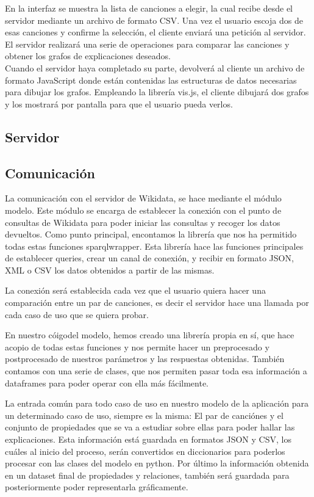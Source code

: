 En la interfaz se muestra la lista de canciones a elegir, la cual recibe desde el servidor mediante un archivo de formato CSV. Una vez el usuario escoja dos de esas canciones y confirme la selección, el cliente enviará una petición al servidor. El servidor realizará una serie de operaciones para comparar las canciones y obtener los grafos de explicaciones deseados.\\

Cuando el servidor haya completado su parte, devolverá al cliente un archivo de formato JavaScript donde están contenidas las estructuras de datos necesarias para dibujar los grafos. Empleando la librería vis.js, el cliente dibujará dos grafos y los mostrará por pantalla para que el usuario pueda verlos.\\

\subsection{Servidor}


\subsection{Comunicación}
La comunicación con el servidor de Wikidata, se hace mediante el módulo modelo. Este módulo se encarga de establecer la conexión con el punto de consultas de Wikidata para poder iniciar las consultas y recoger los datos devueltos. Como punto principal, encontamos la librería que nos ha permitido todas estas funciones sparqlwrapper. Esta librería hace las funciones principales de establecer queries, crear un canal de conexión, y recibir en formato JSON, XML o CSV los datos obtenidos a partir de las mismas. 

La conexión será establecida cada vez que el usuario quiera hacer una comparación entre un par de canciones, es decir el servidor hace una llamada por cada caso de uso que se quiera probar.

En nuestro cóigodel modelo, hemos creado una librería propia en sí, que hace acopio de todas estas funciones y nos permite hacer un preprocesado y postprocesado de nuestros parámetros y las respuestas obtenidas. También contamos con una serie de clases, que nos permiten pasar toda esa información a dataframes para poder operar con ella más fácilmente.

La entrada común para todo caso de uso en nuestro modelo de la aplicación para un determinado caso de uso, siempre es la misma: El par de canciónes y el conjunto de propiedades que se va a estudiar sobre ellas para poder hallar las explicaciones. Esta información está guardada en formatos JSON y CSV, los cuáles al inicio del proceso, serán convertidos en diccionarios para poderlos procesar con las clases del modelo en python. Por último la información obtenida en un dataset final de propiedades y relaciones, también será guardada para posteriormente poder representarla gráficamente.







